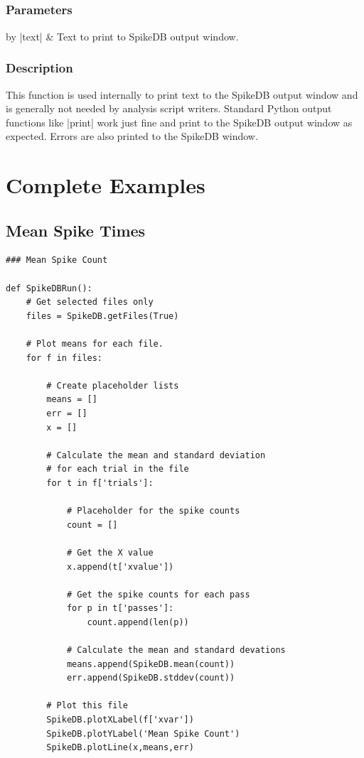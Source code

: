 \documentclass{report}
\begin{document}
\clearpage
\subsection[\method{void}{write}]{}
\subsubsection{Parameters}
\begin{center}
\begin{tabular}{by}
		|text| & Text to print to SpikeDB output window.\\
	\end{tabular}
\end{center}
\subsubsection{Description}
This function is used internally to print text to the SpikeDB output window and is generally not needed by analysis script writers. Standard Python output functions like |print| work just fine and print to the SpikeDB output window as expected. Errors are also printed to the SpikeDB window. 
\clearpage
\section{Complete Examples}
\subsection{Mean Spike Times}
\begin{lstlisting}[label=codeMean,caption=Calculating the mean spike counts.]
### Mean Spike Count

def SpikeDBRun():
	# Get selected files only
	files = SpikeDB.getFiles(True)

	# Plot means for each file.
	for f in files:

		# Create placeholder lists
		means = []
		err = []
		x = []

		# Calculate the mean and standard deviation
		# for each trial in the file
		for t in f['trials']:
			
			# Placeholder for the spike counts
			count = []
			
			# Get the X value
			x.append(t['xvalue'])	

			# Get the spike counts for each pass
			for p in t['passes']:
				count.append(len(p))

			# Calculate the mean and standard devations
			means.append(SpikeDB.mean(count))
			err.append(SpikeDB.stddev(count))

		# Plot this file
		SpikeDB.plotXLabel(f['xvar'])
		SpikeDB.plotYLabel('Mean Spike Count')
		SpikeDB.plotLine(x,means,err)

\end{lstlisting}
\end{document}
